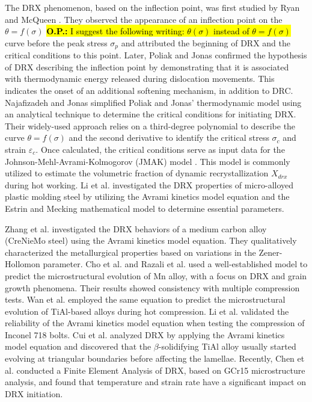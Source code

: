 \documentclass[metals,article,submit,pdftex,moreauthors]{Definitions/mdpi}
\makeatletter
\DeclareRobustCommand{\eal}{et al.\@\xspace}
\DeclareRobustCommand{\OP}[1]{\begingroup\sethlcolor{VWyellow}\textcolor{red}{\hl{\textbf{O.P.:} #1}}\endgroup}
\makeatother
\begin{document}
The DRX phenomenon, based on the inflection point, was first studied by Ryan and McQueen \cite{ryan1989dynamic, ryan1990dynamic, ryan1990flow}.
They observed the appearance of an inflection point on the $\theta=f(\sigma)$ \OP{I suggest the following writing: $\theta(\sigma)$ instead of $\theta=f(\sigma)$} curve before the peak stress $\sigma_p$ and attributed the beginning of DRX and the critical conditions to this point.
Later, Poliak and Jonas \cite{Poliak-1996,ei2003initiation,ei2003critical,jonas2003critical} confirmed the hypothesis of DRX describing the inflection point by demonstrating that it is associated with thermodynamic energy released during dislocation movements.
This indicates the onset of an additional softening mechanism, in addition to DRC.
Najafizadeh and Jonas \cite{najafizadeh2006predicting} simplified Poliak and Jonas' thermodynamic model using an analytical technique to determine the critical conditions for initiating DRX.
Their widely-used approach relies on a third-degree polynomial to describe the curve $\theta=f(\sigma)$ and the second derivative to identify the critical stress $\sigma_c$ and strain $\varepsilon_c$.
Once calculated, the critical conditions serve as input data for the Johnson-Mehl-Avrami-Kolmogorov (JMAK) model \cite{Avrami-1939}.
This model is commonly utilized to estimate the volumetric fraction of dynamic recrystallization $X_{drx}$ during hot working.
Li \eal \cite{li2015experimental} investigated the DRX properties of micro-alloyed plastic molding steel by utilizing the Avrami kinetics model equation and the Estrin and Mecking mathematical model \cite{estrin1984unified,mecking1981kinetics} to determine essential parameters.

Zhang \eal \cite{zhang2016kinetics} investigated the DRX behaviors of a medium carbon alloy (CreNieMo steel) using the Avrami kinetics model equation.
They qualitatively characterized the metallurgical properties based on variations in the Zener-Hollomon parameter.
Cho \eal \cite{cho2005prediction} and Razali \eal \cite{razali2021new} used a well-established model to predict the microstructural evolution of Mn alloy, with a focus on DRX and grain growth phenomena.
Their results showed consistency with multiple compression tests.
Wan \eal \cite{wan2017experimental} employed the same equation to predict the microstructural evolution of TiAl-based alloys during hot compression.
Li \eal \cite{li2018finite} validated the reliability of the Avrami kinetics model equation when testing the compression of Inconel 718 bolts.
Cui \eal \cite{cui2016hot} analyzed DRX by applying the Avrami kinetics model equation and discovered that the $\beta$-solidifying TiAl alloy usually started evolving at triangular boundaries before affecting the lamellae.
Recently, Chen \eal \cite{chen2023finite} conducted a Finite Element Analysis of DRX, based on GCr15 microstructure analysis, and found that temperature and strain rate have a significant impact on DRX initiation.
\end{document}
